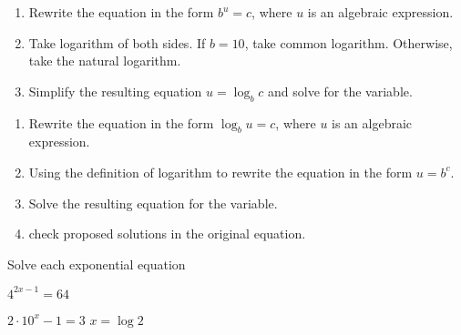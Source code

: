 

\begin{tcolorbox}[colback=white,colframe=cyan, title filled=false, coltitle=cyan, enhanced, attach boxed title to top center={yshift=-3mm,yshifttext=-1mm}, fonttitle=\bfseries, boxed title style={size=small,colback=white},
title=Use logarithms to solve exponential equations
]
\begin{enumerate}
\item  Rewrite the equation in the form $b^u=c$, where $u$ is an algebraic expression. 
\item Take logarithm of both sides. If $b=10$, take common logarithm. Otherwise, take the natural logarithm.
\item Simplify the resulting equation $u=\log_bc$ and solve for the variable. 
\end{enumerate}
\end{tcolorbox}

\begin{tcolorbox}[colback=white,colframe=cyan, title filled=false, coltitle=cyan, enhanced, attach boxed title to top center={yshift=-3mm,yshifttext=-1mm}, fonttitle=\bfseries, boxed title style={size=small,colback=white},
title=Use exponential  form to solve logarithmic equations
]
\begin{enumerate}
\item Rewrite the equation in the form $\log_bu=c$, where $u$ is an algebraic expression. 
\item Using the definition of logarithm to rewrite the equation in the form $u=b^c$.
\item Solve the resulting equation for the variable. 
\item check proposed solutions in the original equation.
\end{enumerate}
\end{tcolorbox}




\begin{exercise}
Solve each exponential equation

\noindent
\begin{enumerate*}[label=(\arabic*)~~]
\item $4^{2x-1}=64$\hspace{0.4\textwidth}
  
\item $2\cdot 10^{x}-1=3$ \quad\quad $x=\log 2$
\end{enumerate*}
\end{exercise}

